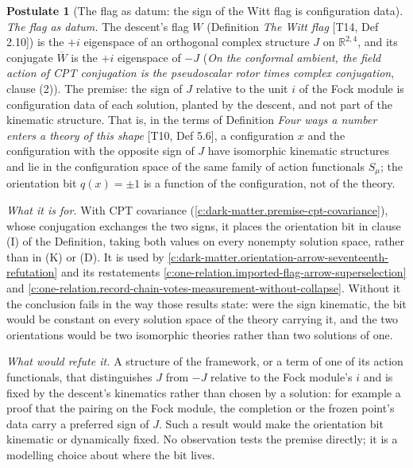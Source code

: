 \documentclass[11pt]{article}
\theoremstyle{definition}
\newtheorem{postulate}[theorem]{Postulate}
\theoremstyle{plain}
\providecommand{\R}{}\renewcommand{\R}{\mathbb{R}}
\begin{document}
\begin{postulate}[The flag as datum: the sign of the Witt flag is configuration data]\label{c:dark-matter.premise-flag-as-datum}
\emph{The flag as datum.} The descent's flag $W$ (Definition \emph{The Witt flag} [T14, Def 2.10]) is the $+i$ eigenspace of an orthogonal complex structure $J$ on $\R^{2,4}$, and its conjugate $\overline W$ is the $+i$ eigenspace of $-J$ (\emph{On the conformal ambient, the field action of CPT conjugation is the pseudoscalar rotor times complex conjugation}, clause (2)). The premise: the sign of $J$ relative to the unit $i$ of the Fock module is configuration data of each solution, planted by the descent, and not part of the kinematic structure. That is, in the terms of Definition \emph{Four ways a number enters a theory of this shape} [T10, Def 5.6], a configuration $x$ and the configuration with the opposite sign of $J$ have isomorphic kinematic structures and lie in the configuration space of the same family of action functionals $S_{\mu}$; the orientation bit $q(x) = \pm 1$ is a function of the configuration, not of the theory.

\emph{What it is for.} With CPT covariance (\ref{c:dark-matter.premise-cpt-covariance}), whose conjugation exchanges the two signs, it places the orientation bit in clause (I) of the Definition, taking both values on every nonempty solution space, rather than in (K) or (D). It is used by \ref{c:dark-matter.orientation-arrow-seventeenth-refutation} and its restatements \ref{c:one-relation.imported-flag-arrow-superselection} and \ref{c:one-relation.record-chain-votes-measurement-without-collapse}. Without it the conclusion fails in the way those results state: were the sign kinematic, the bit would be constant on every solution space of the theory carrying it, and the two orientations would be two isomorphic theories rather than two solutions of one.

\emph{What would refute it.} A structure of the framework, or a term of one of its action functionals, that distinguishes $J$ from $-J$ relative to the Fock module's $i$ and is fixed by the descent's kinematics rather than chosen by a solution: for example a proof that the pairing on the Fock module, the completion or the frozen point's data carry a preferred sign of $J$. Such a result would make the orientation bit kinematic or dynamically fixed. No observation tests the premise directly; it is a modelling choice about where the bit lives.
\end{postulate}
\end{document}
